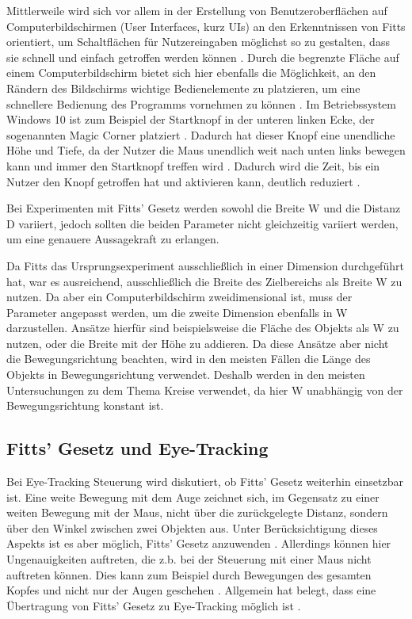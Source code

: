 Mittlerweile wird sich vor allem in der Erstellung von Benutzeroberflächen auf Computerbildschirmen (User Interfaces, kurz UIs) an den Erkenntnissen von Fitts  orientiert, um Schaltflächen für Nutzereingaben möglichst so zu gestalten, dass sie schnell und einfach getroffen werden können \cite{Kexugit.2006}. Durch die begrenzte Fläche auf einem Computerbildschirm bietet sich hier ebenfalls die Möglichkeit, an den Rändern des Bildschirms wichtige Bedienelemente zu platzieren, um eine schnellere Bedienung des Programms vornehmen zu können \cite{Kexugit.2006}. Im Betriebssystem Windows 10 ist zum Beispiel der Startknopf in der unteren linken Ecke, der sogenannten \glqq Magic Corner\grqq{} platziert \cite{Kexugit.2006}. Dadurch hat dieser Knopf eine \glqq unendliche\grqq{} Höhe und Tiefe, da der Nutzer die Maus unendlich weit nach unten links bewegen kann und immer den Startknopf treffen wird \cite{Kexugit.2006}. Dadurch wird die Zeit, bis ein Nutzer den Knopf getroffen hat und aktivieren kann, deutlich reduziert \cite{Soukoreff.2004}.

Bei Experimenten mit Fitts' Gesetz werden sowohl die Breite W und die Distanz D variiert, jedoch sollten die beiden Parameter nicht gleichzeitig variiert werden, um eine genauere Aussagekraft zu erlangen. 

Da Fitts das Ursprungsexperiment ausschließlich in einer Dimension durchgeführt hat, war es ausreichend, ausschließlich die Breite des Zielbereichs als Breite W zu nutzen. Da aber ein Computerbildschirm zweidimensional ist, muss der Parameter angepasst werden, um die zweite Dimension ebenfalls in W darzustellen. Ansätze hierfür sind beispielsweise die Fläche des Objekts als W zu nutzen, oder die Breite mit der Höhe zu addieren. Da diese Ansätze aber nicht die Bewegungsrichtung beachten, wird in den meisten Fällen die Länge des Objekts in Bewegungsrichtung verwendet. Deshalb werden in den meisten Untersuchungen zu dem Thema Kreise verwendet, da hier W unabhängig von der Bewegungsrichtung konstant ist. \cite{Soukoreff.2004}

\subsection{Fitts' Gesetz und Eye-Tracking}
Bei Eye-Tracking Steuerung wird diskutiert, ob Fitts' Gesetz weiterhin einsetzbar ist. Eine weite Bewegung mit dem Auge zeichnet sich, im Gegensatz zu einer weiten Bewegung mit der Maus, nicht über die zurückgelegte Distanz, sondern über den Winkel zwischen zwei Objekten aus. Unter Berücksichtigung dieses Aspekts ist es aber möglich, Fitts' Gesetz anzuwenden \cite{Hansen.2018}. Allerdings können hier Ungenauigkeiten auftreten, die z.b. bei der Steuerung mit einer Maus nicht auftreten können. Dies kann zum Beispiel durch Bewegungen des gesamten Kopfes und nicht nur der Augen geschehen \cite{Hansen.2018}. Allgemein hat \citeauthor{Miniotas.2000} belegt, dass eine Übertragung von Fitts' Gesetz zu Eye-Tracking möglich ist \cite{Miniotas.2000}.

